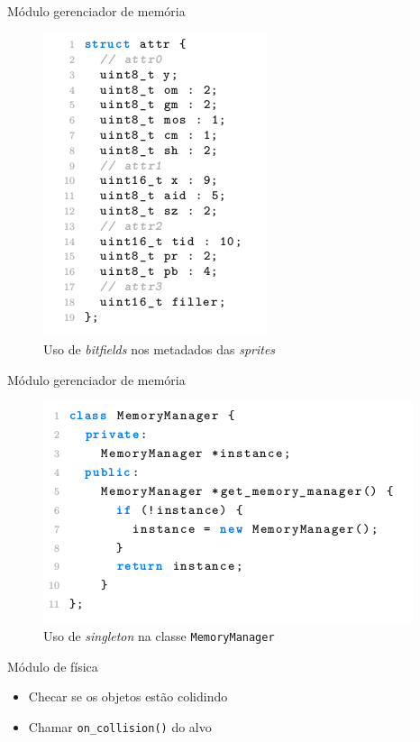 \documentclass[notes, mathserif]{beamer}
\begin{document}
\begin{frame}{M\'odulo gerenciador de mem\'oria}
	\begin{figure}[H]
		\includegraphics[width=.4\linewidth]{figuras/bitfield.png}
		\centering
		\caption{Uso de \textit{bitfields} nos metadados das \textit{sprites}}
		\label{fig:bitfield}
	\end{figure}
\end{frame}

\begin{frame}{M\'odulo gerenciador de mem\'oria}
	\begin{figure}[H]
		\includegraphics[width=.7\linewidth]{figuras/singleton.png}
		\centering
		\caption{Uso de \textit{singleton} na classe \texttt{MemoryManager}}
		\label{fig:singleton}
	\end{figure}
\end{frame}

\begin{frame}{M\'odulo de f\'isica}
	\begin{itemize}
		\item Checar se os objetos est\~ao colidindo
		\item Chamar \texttt{on\_collision()} do alvo
	\end{itemize}
\end{frame}
\end{document}
